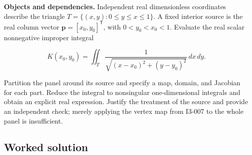 \documentclass[11pt,oneside,openany]{book}
\begin{document}
\textbf{Objects and dependencies.} Independent real dimensionless coordinates describe the triangle \(T=\{(x,y):0\le y\le x\le1\}\). A fixed interior source is the real column vector \(\mathbf p=[x_0,y_0]^{\mathsf T}\), with \(0<y_0<x_0<1\). Evaluate the real scalar nonnegative improper integral

\[
K(x_0,y_0)=\iint_T\frac{1}{\sqrt{(x-x_0)^2+(y-y_0)^2}}\,dx\,dy.
\]

Partition the panel around its source and specify a map, domain, and Jacobian for each part. Reduce the integral to nonsingular one-dimensional integrals and obtain an explicit real expression. Justify the treatment of the source and provide an independent check; merely applying the vertex map from I3-007 to the whole panel is insufficient.
\subsection*{Worked solution}
\end{document}
